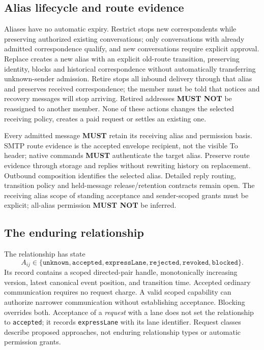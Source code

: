 \documentclass[11pt]{article}
\newcommand{\MUST}{\textbf{MUST}}
\newcommand{\MUSTNOT}{\textbf{MUST NOT}}
\begin{document}
\subsection{Alias lifecycle and route evidence}

Aliases have no automatic expiry. Restrict stops new correspondents while
preserving authorized existing conversations; only conversations with already admitted correspondence qualify,
and new conversations require explicit approval. Replace creates a new alias with an explicit old-route transition,
preserving identity, blocks and historical correspondence without automatically
transferring unknown-sender admission. Retire stops all inbound delivery through
that alias and preserves received correspondence; the member must be told that
notices and recovery messages will stop arriving. Retired addresses \MUSTNOT{}
be reassigned to another member. None of these actions changes the selected
receiving policy, creates a paid request or settles an existing one.

Every admitted message \MUST{} retain its receiving alias and permission basis.
SMTP route evidence is the accepted envelope recipient, not the visible To header;
native commands \MUST{} authenticate the target alias. Preserve route evidence
through storage and replies without rewriting history on replacement. Outbound
composition identifies the selected alias. Detailed reply routing, transition
policy and held-message release/retention contracts remain open. The receiving
alias scope of standing acceptance and sender-scoped grants must be explicit;
all-alias permission \MUSTNOT{} be inferred.

\subsection{The enduring relationship}

The relationship has state
\[
A_{ij}\in\{\texttt{unknown},\texttt{accepted},\texttt{expressLane},\texttt{rejected},
\texttt{revoked},\texttt{blocked}\}.
\]
Its record contains a scoped directed-pair handle, monotonically increasing
version, latest canonical event position, and transition time. Accepted ordinary
communication requires no request charge. A valid scoped capability can authorize
narrower communication without establishing acceptance. Blocking overrides both.
Acceptance of a \emph{request} with a lane does not set the relationship to
\texttt{accepted}; it records \texttt{expressLane} with its lane identifier.
Request classes describe proposed approaches, not enduring
relationship types or automatic permission grants.
\end{document}
